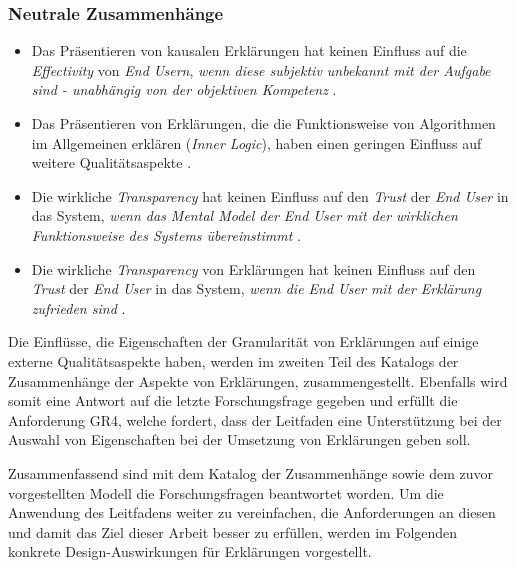 \subsubsection*{Neutrale Zusammenhänge}

\begin{itemize}
    \item Das Präsentieren von kausalen Erklärungen hat keinen Einfluss auf die \textit{Effectivity} von \textit{End Usern}, \textit{wenn diese subjektiv unbekannt mit der Aufgabe sind - unabhängig von der objektiven Kompetenz} \cite{schaffer_i_2019}.
    \item Das Präsentieren von Erklärungen, die die Funktionsweise von Algorithmen im Allgemeinen erklären (\textit{Inner Logic}), haben einen geringen Einfluss auf weitere Qualitätsaspekte \cite{chazette_end-users_nodate}.
    \item Die wirkliche \textit{Transparency} hat keinen Einfluss auf den \textit{Trust} der \textit{End User} in das System, \textit{wenn das Mental Model der End User mit der wirklichen Funktionsweise des Systems übereinstimmt} \cite{eiband_impact_2019, riveiro_thats_2021}.
    \item Die wirkliche \textit{Transparency} von Erklärungen hat keinen Einfluss auf den \textit{Trust} der \textit{End User} in das System, \textit{wenn die End User mit der Erklärung zufrieden sind} \cite{eiband_impact_2019, riveiro_thats_2021}.
\end{itemize}

\smallskip

\noindent{}

\smallskip

Die Einflüsse, die Eigenschaften der Granularität von Erklärungen auf einige externe Qualitätsaspekte haben, werden im zweiten Teil des Katalogs der Zusammenhänge der Aspekte von Erklärungen, zusammengestellt. Ebenfalls wird somit eine Antwort auf die letzte Forschungsfrage gegeben und erfüllt die Anforderung GR4, welche fordert, dass der Leitfaden eine Unterstützung bei der Auswahl von Eigenschaften bei der Umsetzung von Erklärungen geben soll.

\smallskip

Zusammenfassend sind mit dem Katalog der Zusammenhänge sowie dem zuvor vorgestellten Modell die Forschungsfragen beantwortet worden. Um die Anwendung des Leitfadens weiter zu vereinfachen, die Anforderungen an diesen und damit das Ziel dieser Arbeit besser zu erfüllen, werden im Folgenden konkrete Design-Auswirkungen für Erklärungen vorgestellt.

